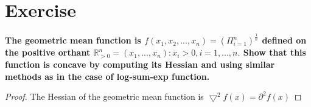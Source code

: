 \documentclass[paper=a4, fontsize=11pt]{scrartcl} %
\begin{document}
\section*{Exercise }
\boldmath
\textbf{The geometric mean function is $f(x_1, x_2, ..., x_n) = \left(\Pi_{i = 1}^{n} \right)^\frac{1}{n}$ defined on the positive orthant $\mathbb{R}_{>0}^n = (x_1, ..., x_n) : x_i > 0, i = 1, ..., n . $  Show that this function is concave by computing its Hessian and using similar methods as in the case of log-sum-exp function.}
\unboldmath
\begin{proof}
The Hessian of the geometric mean function is $\bigtriangledown^2 f(x) = \partial^2 f(x)$
\end{proof}




\begin{comment}
\section*{Exercise   }
\boldmath
\textbf{}
\unboldmath
\begin{proof}
\end{proof}
\section*{Exercise }
\boldmath
\textbf{}
\unboldmath
\begin{proof}
\end{proof}
\end{comment}
\end{document}
